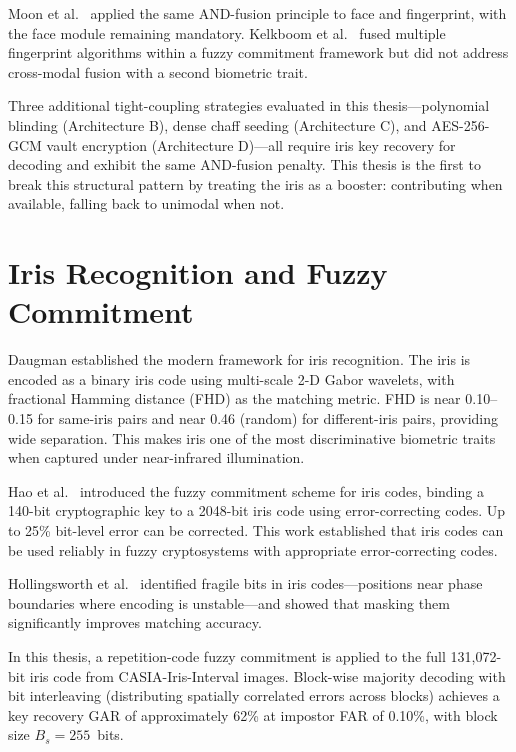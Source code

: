 Moon et al.\ \cite{moon2010multibiometric} applied the same AND-fusion principle
to face and fingerprint, with the face module remaining mandatory. Kelkboom et
al.\ \cite{kelkboom2011multialgorithm} fused multiple fingerprint algorithms within
a fuzzy commitment framework but did not address cross-modal fusion with a
second biometric trait.

Three additional tight-coupling strategies evaluated in this thesis---polynomial
blinding (Architecture B), dense chaff seeding (Architecture C), and
AES-256-GCM vault encryption (Architecture D)---all require iris key recovery for
decoding and exhibit the same AND-fusion penalty. This thesis is the first to break
this structural pattern by treating the iris as a booster: contributing when
available, falling back to unimodal when not.

\section{Iris Recognition and Fuzzy Commitment}

Daugman \cite{daugman2004how} established the modern framework for iris
recognition. The iris is encoded as a binary iris code using multi-scale 2-D
Gabor wavelets, with fractional Hamming distance (FHD) as the matching metric.
FHD is near 0.10--0.15 for same-iris pairs and near 0.46 (random) for
different-iris pairs, providing wide separation. This makes iris one of the most
discriminative biometric traits when captured under near-infrared illumination.

Hao et al.\ \cite{hao2006combining} introduced the fuzzy commitment scheme for
iris codes, binding a 140-bit cryptographic key to a 2048-bit iris code using
error-correcting codes. Up to 25\% bit-level error can be corrected. This work
established that iris codes can be used reliably in fuzzy cryptosystems with
appropriate error-correcting codes.

Hollingsworth et al.\ \cite{hollingsworth2009fragile} identified fragile bits in
iris codes---positions near phase boundaries where encoding is unstable---and showed
that masking them significantly improves matching accuracy.

In this thesis, a repetition-code fuzzy commitment is applied to the full
131{,}072-bit iris code from CASIA-Iris-Interval images. Block-wise majority
decoding with bit interleaving (distributing spatially correlated errors across
blocks) achieves a key recovery GAR of approximately 62\% at impostor FAR of
0.10\%, with block size $B_s = 255$~bits.

